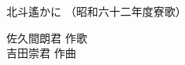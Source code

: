 \documentclass[10pt,b5j]{tarticle} %
\begin{document}
\begin{minipage}[c]{0.7\hsize} %
    \begin{center}
        {\LARGE
            北斗遙かに %
        }
        {\small 
            （昭和六十二年度寮歌） %
        }
    \end{center}
\end{minipage}
\begin{minipage}[c]{0.3\hsize} %
    \begin{flushright} %
        佐久間朗君 作歌\\吉田崇君 作曲 %
    \end{flushright}
\end{minipage}
\end{document}
